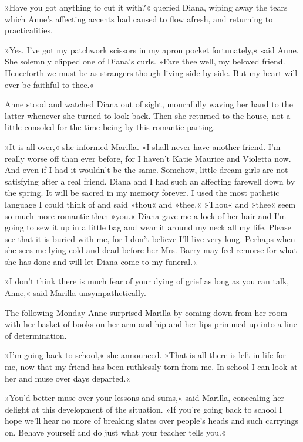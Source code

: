 »Have you got anything to cut it with?« queried Diana, wiping away the tears which Anne's affecting accents had caused to flow afresh, and returning to practicalities.

»Yes. I've got my patchwork scissors in my apron pocket fortunately,« said Anne. She solemnly clipped one of Diana's curls. »Fare thee well, my beloved friend. Henceforth we must be as strangers though living side by side. But my heart will ever be faithful to thee.«

Anne stood and watched Diana out of sight, mournfully waving her hand to the latter whenever she turned to look back. Then she returned to the house, not a little consoled for the time being by this romantic parting.

»It is all over,« she informed Marilla. »I shall never have another friend. I'm really worse off than ever before, for I haven't Katie Maurice and Violetta now. And even if I had it wouldn't be the same. Somehow, little dream girls are not satisfying after a real friend. Diana and I had such an affecting farewell down by the spring. It will be sacred in my memory forever. I used the most pathetic language I could think of and said »thou« and »thee.« »Thou« and »thee« seem so much more romantic than »you.« Diana gave me a lock of her hair and I'm going to sew it up in a little bag and wear it around my neck all my life. Please see that it is buried with me, for I don't believe I'll live very long. Perhaps when she sees me lying cold and dead before her Mrs. Barry may feel remorse for what she has done and will let Diana come to my funeral.«

»I don't think there is much fear of your dying of grief as long as you can talk, Anne,« said Marilla unsympathetically.

The following Monday Anne surprised Marilla by coming down from her room with her basket of books on her arm and hip and her lips primmed up into a line of determination.

»I'm going back to school,« she announced. »That is all there is left in life for me, now that my friend has been ruthlessly torn from me. In school I can look at her and muse over days departed.«

»You'd better muse over your lessons and sums,« said Marilla, concealing her delight at this development of the situation. »If you're going back to school I hope we'll hear no more of breaking slates over people's heads and such carryings on. Behave yourself and do just what your teacher tells you.«

